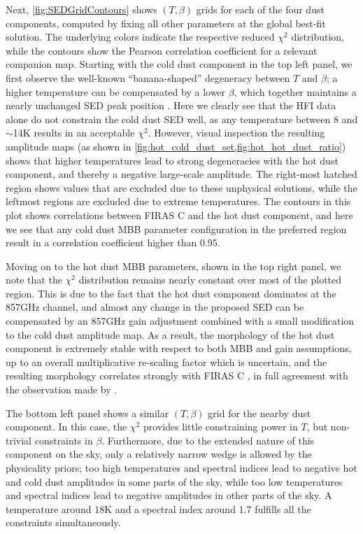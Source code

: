 \documentclass{aa}
\makeatletter
\DeclareRobustCommand{\ion}[2]{%
\relax\ifmmode
\ifx\testbx\f@series
{\mathbf{#1\,\mathsc{#2}}}\else
{\mathrm{#1\,\mathsc{#2}}}\fi
\else\textup{#1\,{\mdseries\textsc{#2}}}%
\fi}
\newcommand{\mathsc}[1]{{\normalfont\textsc{#1}}}
\def\,{\thinspace}
\makeatother
\begin{document}
Next, \cref{fig:SEDGridContours} shows $(T,\beta)$ grids for each of the four dust components, computed by fixing all other parameters at the global best-fit solution. The underlying colors indicate the respective reduced $\chi^2$ distribution, while the contours show the Pearson correlation coefficient for a relevant companion map. Starting with the cold dust component in the top left panel, we first observe the well-known ``banana-shaped'' degeneracy between $T$ and $\beta$; a higher temperature can be compensated by a lower $\beta$, which together maintains a nearly unchanged SED peak position \citep[e.g.,][]{juvela:2012}. Here we clearly see that the HFI data alone do not constrain the cold dust SED well, as any temperature between 8 and $\sim$14\,K results in an acceptable $\chi^2$. However, visual inspection the resulting amplitude maps (as shown in \cref{fig:hot_cold_dust_set,fig:hot_hot_dust_ratio}) shows that higher temperatures lead to strong degeneracies with the hot dust component, and thereby a negative large-scale amplitude. The right-most hatched region shows values that are excluded due to these unphysical solutions, while the leftmost regions are excluded due to extreme temperatures. The contours in this plot shows correlations between FIRAS \ion{C}{ii} and the hot dust component, and here we see that any cold dust MBB parameter configuration in the preferred region result in a correlation coefficient higher than 0.95.

Moving on to the hot dust MBB parameters, shown in the top right panel, we note that the $\chi^2$ distribution remains nearly constant over most of the plotted region. This is due to the fact that the hot dust component dominates at the 857\,GHz channel, and almost any change in the proposed SED can be compensated by an 857\,GHz gain adjustment combined with a small modification to the cold dust amplitude map. As a result, the morphology of the hot dust component is extremely stable with respect to both MBB and gain assumptions, up to an overall multiplicative re-scaling factor which is uncertain, and the resulting morphology correlates strongly with FIRAS \ion{C}{ii}, in full agreement with the observation made by \citet{CG02_05}.

The bottom left panel shows a similar $(T,\beta)$ grid for the nearby dust component. In this case, the $\chi^2$ provides little constraining power in $T$, but non-trivial constraints in $\beta$. Furthermore, due to the extended nature of this component on the sky, only a relatively narrow wedge is allowed by the physicality priors; too high temperatures and spectral indices lead to negative hot and cold dust amplitudes in some parts of the sky, while too low temperatures and spectral indices lead to negative amplitudes in other parts of the sky. A temperature around 18\,K and a spectral index around 1.7 fulfills all the constraints simultaneously.
\end{document}
